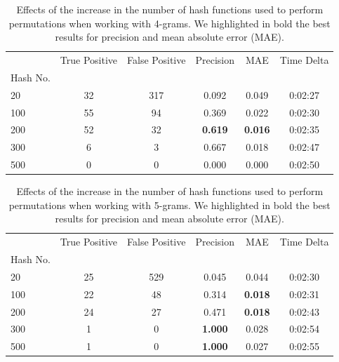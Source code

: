 \documentclass[runningheads]{llncs}
\begin{document}
\begin{table}
  \caption{Effects of the increase in the number of hash functions used to perform permutations when working with 4-grams. We highlighted in bold the best results for precision and mean absolute error (MAE).}
  \label{tab:experiments:hashes_k4}
  \centering
  \begin{tabular}{lccccc}
    \toprule
    {} &  True Positive &  False Positive &  Precision &    MAE & Time Delta \\
    Hash No. &                &                 &            &        &            \\
    \midrule
    20         &             32 &             317 &      0.092 &  0.049 &    0:02:27 \\
    100        &             55 &              94 &      0.369 &  0.022 &    0:02:30 \\
    200        &             52 &              32 &      \textbf{0.619} &  \textbf{0.016} &    0:02:35 \\
    300        &              6 &               3 &      0.667 &  0.018 &    0:02:47 \\
    500        &              0 &               0 &      0.000 &  0.000 &    0:02:50 \\
    \bottomrule
    \end{tabular}
\end{table}

\begin{table}
  \caption{Effects of the increase in the number of hash functions used to perform permutations when working with 5-grams. We highlighted in bold the best results for precision and mean absolute error (MAE).}
  \label{tab:experiments:hashes_k5}
  \centering
  \begin{tabular}{lccccc}
    \toprule
    {} &  True Positive &  False Positive &  Precision &    MAE & Time Delta \\
    Hash No. &                &                 &            &        &            \\
    \midrule
    20         &             25 &             529 &      0.045 &  0.044 &    0:02:30 \\
    100        &             22 &              48 &      0.314 &  \textbf{0.018} &    0:02:31 \\
    200        &             24 &              27 &      0.471 &  \textbf{0.018} &    0:02:43 \\
    300        &              1 &               0 &      \textbf{1.000} &  0.028 &    0:02:54 \\
    500        &              1 &               0 &      \textbf{1.000} &  0.027 &    0:02:55 \\
    \bottomrule
    \end{tabular}
\end{table}
\end{document}
